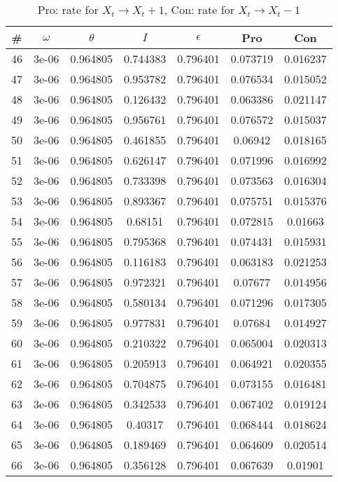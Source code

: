 \newpage
\begin{table}
\caption{Pro: rate for $X_t \rightarrow X_t + 1$, Con: rate for $X_t \rightarrow X_t - 1$}
\begin{tabular*}{\linewidth}{c|c|c|c|c|c|c}
\# & $\omega$ & $\theta$ & $I$ & $\epsilon$ & Pro & Con \\
\hline
46 & 3e-06 & 0.964805 & 0.744383 & 0.796401 & 0.073719 & 0.016237\\
47 & 3e-06 & 0.964805 & 0.953782 & 0.796401 & 0.076534 & 0.015052\\
48 & 3e-06 & 0.964805 & 0.126432 & 0.796401 & 0.063386 & 0.021147\\
49 & 3e-06 & 0.964805 & 0.956761 & 0.796401 & 0.076572 & 0.015037\\
50 & 3e-06 & 0.964805 & 0.461855 & 0.796401 & 0.06942 & 0.018165\\
51 & 3e-06 & 0.964805 & 0.626147 & 0.796401 & 0.071996 & 0.016992\\
52 & 3e-06 & 0.964805 & 0.733398 & 0.796401 & 0.073563 & 0.016304\\
53 & 3e-06 & 0.964805 & 0.893367 & 0.796401 & 0.075751 & 0.015376\\
54 & 3e-06 & 0.964805 & 0.68151 & 0.796401 & 0.072815 & 0.01663\\
55 & 3e-06 & 0.964805 & 0.795368 & 0.796401 & 0.074431 & 0.015931\\
56 & 3e-06 & 0.964805 & 0.116183 & 0.796401 & 0.063183 & 0.021253\\
57 & 3e-06 & 0.964805 & 0.972321 & 0.796401 & 0.07677 & 0.014956\\
58 & 3e-06 & 0.964805 & 0.580134 & 0.796401 & 0.071296 & 0.017305\\
59 & 3e-06 & 0.964805 & 0.977831 & 0.796401 & 0.07684 & 0.014927\\
60 & 3e-06 & 0.964805 & 0.210322 & 0.796401 & 0.065004 & 0.020313\\
61 & 3e-06 & 0.964805 & 0.205913 & 0.796401 & 0.064921 & 0.020355\\
62 & 3e-06 & 0.964805 & 0.704875 & 0.796401 & 0.073155 & 0.016481\\
63 & 3e-06 & 0.964805 & 0.342533 & 0.796401 & 0.067402 & 0.019124\\
64 & 3e-06 & 0.964805 & 0.40317 & 0.796401 & 0.068444 & 0.018624\\
65 & 3e-06 & 0.964805 & 0.189469 & 0.796401 & 0.064609 & 0.020514\\
66 & 3e-06 & 0.964805 & 0.356128 & 0.796401 & 0.067639 & 0.01901\\

\end{tabular*}
\end{table}
